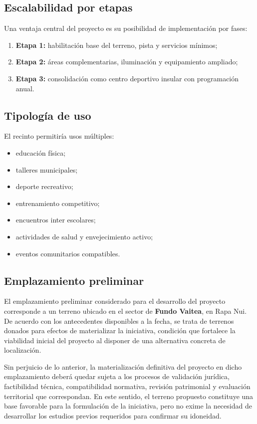 \documentclass[12pt,letterpaper]{article}
\begin{document}
\subsection{Escalabilidad por etapas}

Una ventaja central del proyecto es su posibilidad de implementación por fases:

\begin{enumerate}
    \item \textbf{Etapa 1:} habilitación base del terreno, pista y servicios mínimos;
    \item \textbf{Etapa 2:} áreas complementarias, iluminación y equipamiento ampliado;
    \item \textbf{Etapa 3:} consolidación como centro deportivo insular con programación anual.
\end{enumerate}

\subsection{Tipología de uso}

El recinto permitiría usos múltiples:

\begin{itemize}
    \item educación física;
    \item talleres municipales;
    \item deporte recreativo;
    \item entrenamiento competitivo;
    \item encuentros inter escolares;
    \item actividades de salud y envejecimiento activo;
    \item eventos comunitarios compatibles.
\end{itemize}

\subsection{Emplazamiento preliminar}

El emplazamiento preliminar considerado para el desarrollo del proyecto corresponde a un terreno ubicado en el sector de \textbf{Fundo Vaitea}, en Rapa Nui. De acuerdo con los antecedentes disponibles a la fecha, se trata de terrenos donados para efectos de materializar la iniciativa, condición que fortalece la viabilidad inicial del proyecto al disponer de una alternativa concreta de localización.

Sin perjuicio de lo anterior, la materialización definitiva del proyecto en dicho emplazamiento deberá quedar sujeta a los procesos de validación jurídica, factibilidad técnica, compatibilidad normativa, revisión patrimonial y evaluación territorial que correspondan. En este sentido, el terreno propuesto constituye una base favorable para la formulación de la iniciativa, pero no exime la necesidad de desarrollar los estudios previos requeridos para confirmar su idoneidad.
\end{document}
